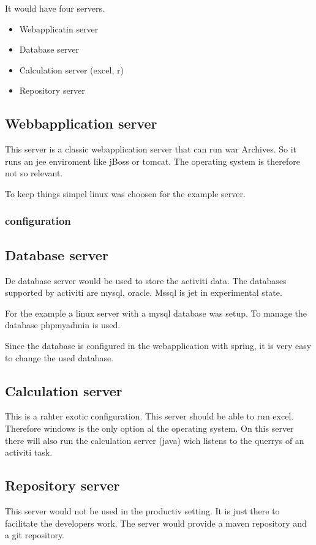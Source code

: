 \documentclass[paper=a4,twoside=false,BCOR=0mm,DIV=calc,fontsize=12pt]{scrartcl}
\begin{document}
It would have four servers. 
\begin{itemize}
 \item Webapplicatin server
 \item Database server
 \item Calculation server (excel, r)
 \item Repository server
\end{itemize}

\subsection{Webbapplication server}
This server is a classic webapplication server that can run war Archives. 
So it runs an jee enviroment like jBoss or tomcat.
The operating system is therefore not so relevant. 

To keep things simpel linux was choosen for the example server.

\subsubsection{configuration}


\subsection{Database server}
De database server would be used to store the activiti data. The databases supported by activiti are mysql, oracle. Mssql is jet in experimental state.
 
For the example a linux server with a mysql database was setup.
To manage the database phpmyadmin is used.

Since the database is configured in the webapplication with spring, it is very easy to change the used database.


\subsection{Calculation server}
This is a rahter exotic configuration. This server should be able to run excel. Therefore windows is the only option al the operating system. On this server there will also run the calculation server (java) wich listens to the querrys of an activiti task.



\subsection{Repository server}
This server would not be used in the productiv setting. It is just there to facilitate the developers work.
The server would provide a maven repository and a git repository. 
\end{document}
